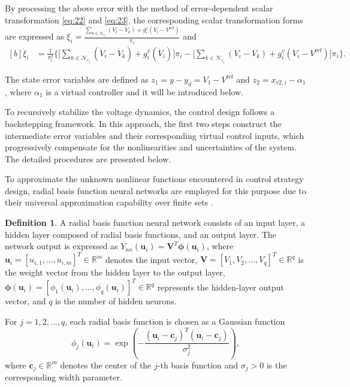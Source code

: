 \documentclass[]{interact}
\theoremstyle{plain}%
\theoremstyle{definition}
\newtheorem{definition}{Definition}
\theoremstyle{remark}
\begin{document}
By processing the above error \citep{Yl2025} with the method of error-dependent scalar transformation \eqref{eq:22} and \eqref{eq:23}, the corresponding scalar transformation forms are expressed as $\xi_i = \frac{\sum_{k \in \mathcal{N}_{c_i}} (V_i - V_k) + g_i^v (V_i - V^{\text{ref}})}{\pi_i}$ and
$\begin{aligned}[b]
\dot{\xi}_i &= \frac{1}{\pi_i^2} \bigg\{ \bigg[ \sum_{k \in \mathcal{N}_{c_i}} (\dot{V}_i - \dot{V}_k) + g_i^v (\dot{V}_i) \bigg] \pi_i - \bigg[ \sum_{k \in \mathcal{N}_{c_i}} (V_i - V_k) + g_i^v (V_i - V^{\text{ref}}) \bigg] \dot{\pi}_i \bigg\}.
\end{aligned}$

The state error variables are defined as $z_1 = y - y_d = V_1 - V^{\text{ref}}$ and $z_2 = x_{v2,i} - \alpha_{1}$, where \( \alpha_{1} \) is a virtual controller and it will be introduced below.

To recursively stabilize the voltage dynamics, the control design follows a backstepping framework. In this approach, the first two steps construct the intermediate error variables and their corresponding virtual control inputs, which progressively compensate for the nonlinearities and uncertainties of the system. The detailed procedures are presented below.

To approximate the unknown nonlinear functions encountered in control strategy design, radial basis function neural networks are employed for this purpose due to their universal approximation capability over finite sets \citep{Aysu2023,Lin2025}.

\begin{definition}
\label{definition:RBFNN}
\citep{Fm2023} A radial basis function neural network consists of an input layer, a hidden layer composed of radial basis functions, and an output layer. The network output is expressed as 
$Y_{nn}(\boldsymbol{u}_i) = \boldsymbol{V}^{T} \boldsymbol{\phi}(\boldsymbol{u}_i)$, 
where $\boldsymbol{u}_i = [u_{i,1}, \dots, u_{i,m}]^{T} \in \mathbb{R}^{m}$ denotes the input vector, $\boldsymbol{V} = [V_{1}, V_{2}, \dots, V_{q}]^{T} \in \mathbb{R}^{q}$ is the weight vector from the hidden layer to the output layer, $\boldsymbol{\phi}(\boldsymbol{u}_i) = [\phi_{1}(\boldsymbol{u}_i), \dots, \phi_{q}(\boldsymbol{u}_i)]^{T} \in \mathbb{R}^{q}$ represents the hidden-layer output vector, and $q$ is the number of hidden neurons.

For $j = 1,2,\dots,q$, each radial basis function is chosen as a Gaussian function
\begin{equation}
\phi_j(\boldsymbol{u}_i) = \exp
\left(
-\frac{(\boldsymbol{u}_i - \boldsymbol{c}_j)^{T}(\boldsymbol{u}_i - \boldsymbol{c}_j)}{\sigma_j^{2}}
\right),
\end{equation}
where $\boldsymbol{c}_j \in \mathbb{R}^{m}$ denotes the center of the $j$-th basis function and $\sigma_j > 0$ is the corresponding width parameter.
\end{definition}
\end{document}

